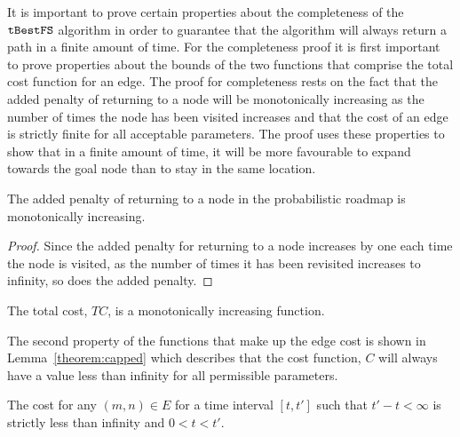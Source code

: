It is important to prove certain properties about the completeness of the
$\Acronym{tBestFS}$ algorithm in order to guarantee that the algorithm will
always return a path in a finite amount of time. For the completeness proof it
is first important to prove properties about the bounds of the two functions
that comprise the total cost function for an edge. The proof for completeness
rests on the fact that the added penalty of returning to a node will be
monotonically increasing as the number of times the node has been visited
increases and that the cost of an edge is strictly finite for all acceptable
parameters. The proof uses these properties to show that in a finite amount of
time, it will be more favourable to expand towards the goal node than to stay
in the same location.

\begin{lemma}

    \label{theorem:increasing}

    The added penalty of returning to a node in the probabilistic roadmap is
    monotonically increasing.

\end{lemma}

\begin{proof}

    Since the added penalty for returning to a node increases by one each time
    the node is visited, as the number of times it has been revisited increases
    to infinity, so does the added penalty.

\end{proof}

\begin{corollary}

    The total cost, $TC$, is a monotonically increasing function.

\end{corollary}

The second property of the functions that make up the edge cost is shown in
Lemma~\ref{theorem:capped} which describes that the cost function, $C$ will
always have a value less than infinity for all permissible parameters.

\begin{lemma}

    \label{theorem:capped}

    The cost for any $(m, n) \in E$ for a time interval $[t, t']$ such that $t'
    - t < \infty$ is strictly less than infinity and $0 < t < t'$.

\end{lemma}


